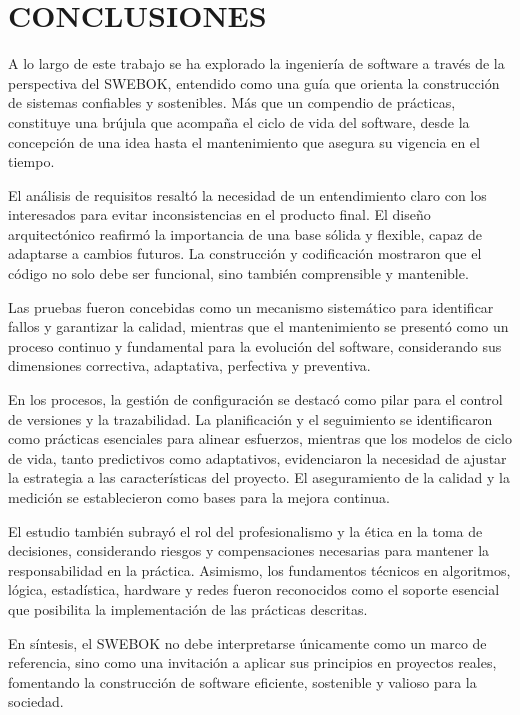\chapter*{CONCLUSIONES}
\label{cap:conclusiones}

A lo largo de este trabajo se ha explorado la ingeniería de software a través de la perspectiva del SWEBOK, entendido como una guía que orienta la construcción de sistemas confiables y sostenibles. Más que un compendio de prácticas, constituye una brújula que acompaña el ciclo de vida del software, desde la concepción de una idea hasta el mantenimiento que asegura su vigencia en el tiempo.

El análisis de requisitos resaltó la necesidad de un entendimiento claro con los interesados para evitar inconsistencias en el producto final. El diseño arquitectónico reafirmó la importancia de una base sólida y flexible, capaz de adaptarse a cambios futuros. La construcción y codificación mostraron que el código no solo debe ser funcional, sino también comprensible y mantenible.

Las pruebas fueron concebidas como un mecanismo sistemático para identificar fallos y garantizar la calidad, mientras que el mantenimiento se presentó como un proceso continuo y fundamental para la evolución del software, considerando sus dimensiones correctiva, adaptativa, perfectiva y preventiva.

En los procesos, la gestión de configuración se destacó como pilar para el control de versiones y la trazabilidad. La planificación y el seguimiento se identificaron como prácticas esenciales para alinear esfuerzos, mientras que los modelos de ciclo de vida, tanto predictivos como adaptativos, evidenciaron la necesidad de ajustar la estrategia a las características del proyecto. El aseguramiento de la calidad y la medición se establecieron como bases para la mejora continua.

El estudio también subrayó el rol del profesionalismo y la ética en la toma de decisiones, considerando riesgos y compensaciones necesarias para mantener la responsabilidad en la práctica. Asimismo, los fundamentos técnicos en algoritmos, lógica, estadística, hardware y redes fueron reconocidos como el soporte esencial que posibilita la implementación de las prácticas descritas.

En síntesis, el SWEBOK no debe interpretarse únicamente como un marco de referencia, sino como una invitación a aplicar sus principios en proyectos reales, fomentando la construcción de software eficiente, sostenible y valioso para la sociedad.
